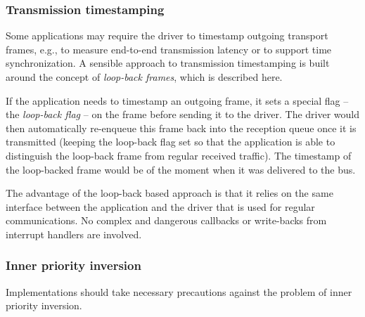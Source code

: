 \subsubsection{Transmission timestamping}

\begin{remark}[breakable]
    Some applications may require the driver to timestamp outgoing transport frames,
    e.g., to measure end-to-end transmission latency or to support time synchronization.
    A sensible approach to transmission timestamping is built around the concept of \emph{loop-back frames},
    which is described here.

    If the application needs to timestamp an outgoing frame, it sets a special flag -- the \emph{loop-back flag} --
    on the frame before sending it to the driver.
    The driver would then automatically re-enqueue this frame back into the reception queue once it is transmitted
    (keeping the loop-back flag set so that the application is able to distinguish the loop-back
    frame from regular received traffic).
    The timestamp of the loop-backed frame would be of the moment when it was delivered to the bus.

    The advantage of the loop-back based approach is that it relies on the same interface between
    the application and the driver that is used for regular communications.
    No complex and dangerous callbacks or write-backs from interrupt handlers are involved.
\end{remark}

\subsubsection{Inner priority inversion}

Implementations should take necessary precautions against the problem of inner priority inversion.

